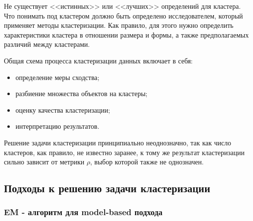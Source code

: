 \documentclass[10pt]{article}
\begin{document}
Не существует <<истинных>> или <<лучших>> определений для кластера. Что понимать под кластером должно быть определено исследователем, который применяет методы кластеризации. Как правило, для этого нужно определить характеристики кластера в отношении размера и формы, а также предполагаемых различий между кластерами.

Общая схема процесса кластеризации данных включает в себя: 
\begin{itemize}
	\item определение меры сходства;
	\item разбиение множества объектов на кластеры;
	\item оценку качества кластеризации;
	\item интерпретацию результатов.
\end{itemize}
	
Решение задачи кластеризации принципиально неоднозначно, так как число кластеров, как правило, не известно заранее, к тому же результат кластеризации сильно зависит от метрики $\rho$, выбор которой также не однозначен.

\subsection{Подходы к решению задачи кластеризации}

\subsubsection{EM - алгоритм для model-based подхода}
\end{document}
